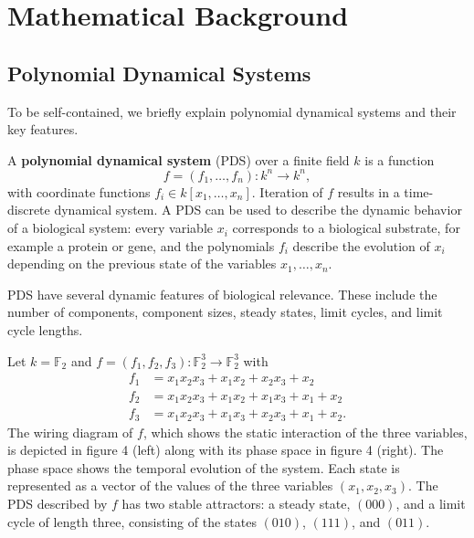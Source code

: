 \documentclass[10pt]{bmc_article}
\newenvironment{bmcformat}{\fussy\setboolean{publ}{true}}{\fussy}
\begin{document}
\begin{bmcformat}
\appendix
\section{Mathematical Background}
\subsection{Polynomial Dynamical Systems}\label{sec:pds}
To be self-contained, we briefly explain polynomial dynamical systems and their key features.

A {\bf polynomial dynamical system} (PDS) \cite{JLSS} over a finite field $k$ is a function
$$f = (f_1, \ldots, f_n) : k^n \rightarrow k^n,$$
with coordinate functions $f_i \in k[x_1, \ldots , x_n]$. Iteration of $f$ results
in a time-discrete dynamical system. A PDS can be used to describe the dynamic behavior of a biological system: every variable $x_i$ corresponds to a biological substrate, for example a protein or gene, and the polynomials $f_i$ describe the evolution of $x_i$ depending on the previous state of the variables $x_1, \ldots, x_n$.


PDS have several dynamic features of biological
relevance. These include the number of components, component sizes, steady states, limit cycles, and limit cycle lengths.
\begin{example}
Let $k= \mathbb F_2$ and $f = (f_1, f_2, f_3) : \mathbb F_2^3 \rightarrow
\mathbb F_2^3$ with
\begin{align*}
f_1 &= x_1x_2x_3+x_1x_2+x_2x_3+x_2 \\
f_2 &= x_1x_2x_3+x_1x_2+x_1x_3+x_1+x_2 \\
f_3 &= x_1x_2x_3+x_1x_3+x_2x_3+x_1+x_2.
\end{align*}
The wiring diagram of $f$, which shows the static interaction of the three
variables, is
depicted in figure 4 (left) along with its phase space in figure
4 (right).
The phase space shows the temporal evolution of the system. Each state is
represented as a vector of the values of the three variables $(x_1, x_2,
x_3)$.
The PDS described by $f$ has
two stable attractors: a steady state, $(000)$, and a limit cycle of length
three, consisting of the states $(010)$, $(111)$, and $(011)$.
\end{example}



\end{bmcformat}
\end{document}

